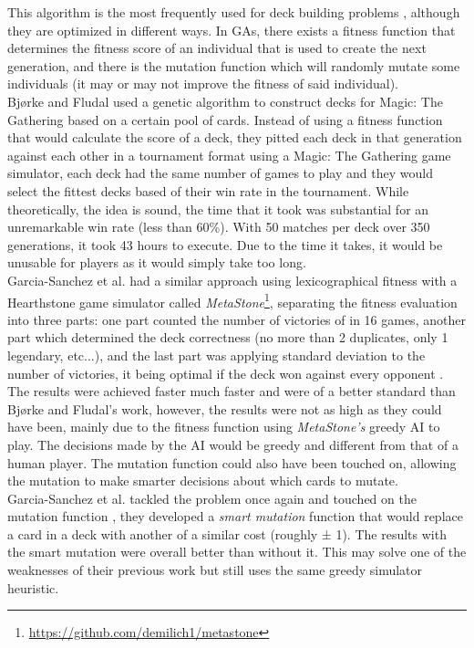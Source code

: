 \documentclass{report} %
\begin{document}
This algorithm is the most frequently used for deck building problems \cite{Fludal2017}\cite{GarciaSanchez2016}\cite{GarciaSanchez2018}, although they are optimized in different ways. In GAs, there exists a fitness function that determines the fitness score of an individual that is used to create the next generation, and there is the mutation function which will randomly mutate some individuals (it may or may not improve the fitness of said individual). \\ 
\indent Bjørke and Fludal \cite{Fludal2017} used a genetic algorithm to construct decks for Magic: The Gathering based on a certain pool of cards. Instead of using a fitness function that would calculate the score of a deck, they pitted each deck in that generation against each other in a tournament format using a Magic: The Gathering game simulator, each deck had the same number of games to play and they would select the fittest decks based of their win rate in the tournament. While theoretically, the idea is sound, the time that it took was substantial for an unremarkable win rate (less than 60\%). With 50 matches per deck over 350 generations, it took 43 hours to execute. Due to the time it takes, it would be unusable for players as it would simply take too long.\\
\indent Garcia-Sanchez et al. had a similar approach using lexicographical fitness with a Hearthstone game simulator called \textit{MetaStone}\footnote{\url{https://github.com/demilich1/metastone}}, separating the fitness evaluation into three parts: one part counted the number of victories of in 16 games, another part which determined the deck correctness (no more than 2 duplicates, only 1 legendary, etc...), and the last part was applying standard deviation to the number of victories, it being optimal if the deck won against every opponent \cite{GarciaSanchez2016}. The results were achieved faster much faster and were of a better standard than Bjørke and Fludal's work\cite{Fludal2017}, however, the results were not as high as they could have been, mainly due to the fitness function using \textit{MetaStone's} greedy AI to play. The decisions made by the AI would be greedy and different from that of a human player. The mutation function could also have been touched on, allowing the mutation to make smarter decisions about which cards to mutate. \\
\indent Garcia-Sanchez et al. tackled the problem once again and touched on the mutation function \cite{GarciaSanchez2018}, they developed a \textit{smart mutation} function that would replace a card in a deck with another of a similar cost (roughly ± 1). The results with the smart mutation were overall better than without it. This may solve one of the weaknesses of their previous work\cite{GarciaSanchez2016} but still uses the same greedy simulator heuristic.
\end{document}
